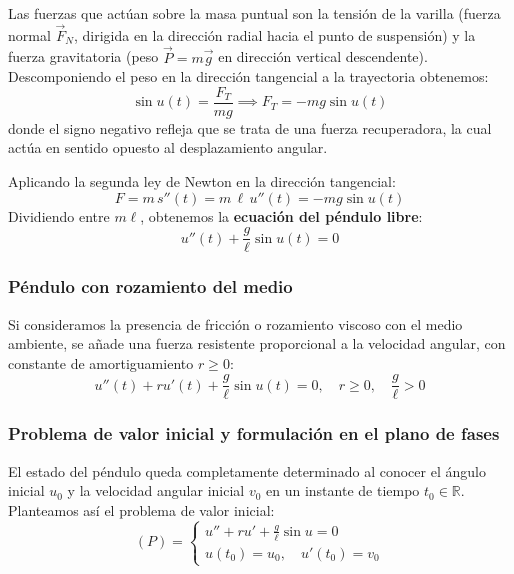 \begin{center}
\end{center}

Las fuerzas que actúan sobre la masa puntual son la tensión de la varilla (fuerza normal $\vec{F}_N$, dirigida en la dirección radial hacia el punto de suspensión) y la fuerza gravitatoria (peso $\vec{P} = m \vec{g}$ en dirección vertical descendente). Descomponiendo el peso en la dirección tangencial a la trayectoria obtenemos:
\[
    \sin u(t) = \frac{F_T}{m g} \implies F_T = - m g \sin u(t)
\]
donde el signo negativo refleja que se trata de una fuerza recuperadora, la cual actúa en sentido opuesto al desplazamiento angular.

Aplicando la segunda ley de Newton en la dirección tangencial:
\[
    F = m \, s''(t) = m \, \ell \, u''(t) = - m g \sin u(t)
\]
Dividiendo entre $m \ell$, obtenemos la \textbf{ecuación del péndulo libre}:
\[
    \boxed{u''(t) + \frac{g}{\ell} \sin u(t) = 0}
\]

\subsubsection{Péndulo con rozamiento del medio}

Si consideramos la presencia de fricción o rozamiento viscoso con el medio ambiente, se añade una fuerza resistente proporcional a la velocidad angular, con constante de amortiguamiento $r \geq 0$:
\[
    u''(t) + r u'(t) + \frac{g}{\ell} \sin u(t) = 0, \quad r \geq 0, \quad \frac{g}{\ell} > 0
\]

\subsubsection{Problema de valor inicial y formulación en el plano de fases}

El estado del péndulo queda completamente determinado al conocer el ángulo inicial $u_0$ y la velocidad angular inicial $v_0$ en un instante de tiempo $t_0 \in \mathbb{R}$. Planteamos así el problema de valor inicial:
\[
    (P) =
    \begin{cases}
        u'' + r u' + \frac{g}{\ell} \sin u = 0 \\
        u(t_0) = u_0, \quad u'(t_0) = v_0
    \end{cases}
\]

